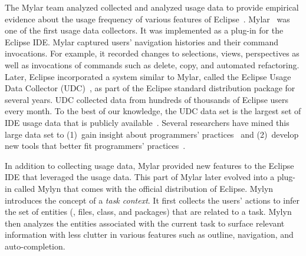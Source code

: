 The Mylar team analyzed collected and analyzed usage data to provide empirical
evidence about the usage frequency of various features of
Eclipse~\cite{V:Murphy2006How}.
%
Mylar~\cite{V:Murphy2006How} was one of the first usage data collectors. It was
implemented as a plug-in for the Eclipse IDE. Mylar captured users' navigation
histories and their command invocations. For example, it recorded changes to
selections, views, perspectives as well as invocations of commands such as
delete, copy, and automated refactoring.
%
Later, Eclipse incorporated a system similar to Mylar, called the Eclipse Usage
Data Collector (UDC)~\cite{WebPageUDC}, as part of the Eclipse standard
distribution package for several years. UDC collected data from hundreds of
thousands of Eclipse users every month. To the best of our knowledge, the UDC
data set is the largest set of IDE usage data that is publicly
available~\cite{WebPageUDCArchive}. Several researchers have mined this large
data set to
%
(1)~gain insight about programmers'
practices~\cite{VakilianJohnson2014Alternate, VakilianETAL2013Compositional,
V:MurphyHill2012How} and
%
(2)~develop new tools that better fit programmers'
practices~\cite{MurphyHill2012Improving, VakilianETAL2013Compositional,
Kersten-Mylar2005}.

In addition to collecting usage data, Mylar provided new features to the Eclipse
IDE that leveraged the usage data. This part of Mylar later evolved into a
plug-in called Mylyn that comes with the official distribution of Eclipse. Mylyn
introduces the concept of a \emph{task context}. It first collects the users'
actions to infer the set of entities (\eg, files, class, and packages) that are
related to a task. Mylyn then analyzes the entities associated with the current
task to surface relevant information with less clutter in various features such
as outline, navigation, and auto-completion.

